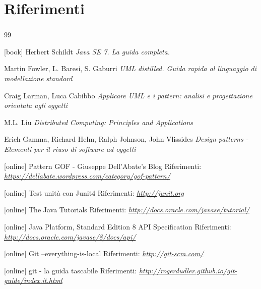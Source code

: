 \documentclass[t]{beamer} %
\begin{document}
\section {Riferimenti}
\begin {frame} [allowframebreaks] 
 \frametitle {\refname}
  \begin {thebibliography}{99}
   {\tiny 
     [book]
      Herbert Schildt
     \newblock \emph{Java SE 7. La guida completa.} 

       Martin Fowler, L. Baresi, S. Gaburri 
     \newblock \emph{UML distilled. Guida rapida al linguaggio di modellazione standard} 

      Craig Larman, Luca Cabibbo
     \newblock \emph{Applicare UML e i pattern: analisi e progettazione orientata agli oggetti} 

      M.L. Liu
     \newblock \emph{Distributed Computing: Principles and Applications} 

      Erich Gamma, Richard Helm, Ralph Johnson, John Vlissides
     \newblock \emph{Design patterns - Elementi per il riuso di software ad oggetti} 
      
     [online]
      Pattern GOF - Giuseppe Dell'Abate's Blog
     \newblock Riferimenti: \emph{\url{https://dellabate.wordpress.com/category/gof-pattern/ }}

     [online]
      Test unità con Junit4
     \newblock Riferimenti: \emph{\url{http://junit.org }}

     [online]
      The Java Tutorials 
     \newblock Riferimenti: \emph{\url{http://docs.oracle.com/javase/tutorial/ }}

     [online]
      Java Platform, Standard Edition 8 API Specification 
     \newblock Riferimenti: \emph{\url{http://docs.oracle.com/javase/8/docs/api/ }}

     [online]
      Git --everything-is-local  
     \newblock Riferimenti: \emph{\url{http://git-scm.com/ }}

     [online]
      git - la guida tascabile 
     \newblock Riferimenti: \emph{\url{http://rogerdudler.github.io/git-guide/index.it.html }}
   }
   \end {thebibliography}
\end {frame}
\end{document}
